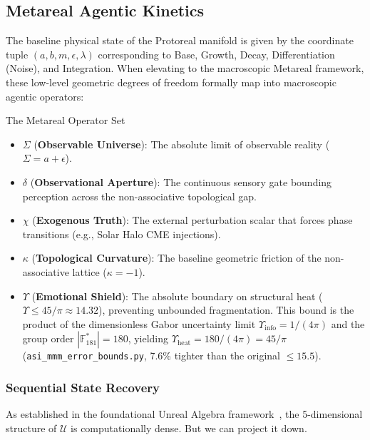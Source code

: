 \subsection{Metareal Agentic Kinetics}

The baseline physical state of the Protoreal manifold is given by the coordinate tuple $(a, b, m, \epsilon, \lambda)$ corresponding to Base, Growth, Decay, Differentiation (Noise), and Integration. When elevating to the macroscopic Metareal framework, these low-level geometric degrees of freedom formally map into macroscopic agentic operators:

\begin{metarealbox}{The Metareal Operator Set}
\begin{itemize}
    \item $\Sigma$ (\textbf{Observable Universe}): The absolute limit of observable reality ($\Sigma = a + \epsilon$).
    \item $\delta$ (\textbf{Observational Aperture}): The continuous sensory gate bounding perception across the non-associative topological gap.
    \item $\chi$ (\textbf{Exogenous Truth}): The external perturbation scalar that forces phase transitions (e.g., Solar Halo CME injections).
    \item $\kappa$ (\textbf{Topological Curvature}): The baseline geometric friction of the non-associative lattice ($\kappa = -1$).
    \item $\Upsilon$ (\textbf{Emotional Shield}): The absolute boundary on structural heat ($\Upsilon \le 45/\pi \approx 14.32$), preventing unbounded fragmentation. This bound is the product of the dimensionless Gabor uncertainty limit $\Upsilon_{\mathrm{info}} = 1/(4\pi)$ and the group order $|\mathbb{F}_{181}^*| = 180$, yielding $\Upsilon_{\mathrm{heat}} = 180/(4\pi) = 45/\pi$ (\texttt{asi\_mmm\_error\_bounds.py}, 7.6\% tighter than the original $\le 15.5$).
\end{itemize}
\end{metarealbox}

\subsubsection{Sequential State Recovery}

As established in the foundational Unreal Algebra framework~\cite{larue_lc}, the 5-dimensional structure of $\mathcal{U}$ is computationally dense. But we can project it down.

